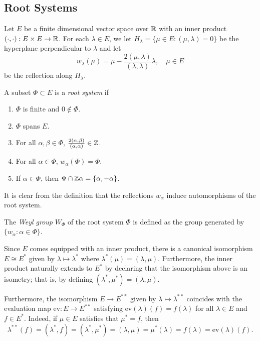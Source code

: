 \subsection{Root Systems}
Let $E$ be a finite dimensional vector space over $\mathbb{R}$ with an inner product $(\cdot,\cdot):E\times E\to\mathbb{R}$. For each $\lambda\in E$, we let $H_\lambda=\{\mu\in E:(\mu,\lambda)=0\}$ be the hyperplane perpendicular to $\lambda$ and let $$w_\lambda(\mu)=\mu-\frac{2(\mu,\lambda)}{(\lambda,\lambda)}\lambda,\quad \mu\in E$$ be the reflection along $H_\lambda$. 
\begin{definition}\label{def:rootsystem}
    A subset $\Phi\subset E$ is a \textit{root system} if
    \begin{enumerate}
        \item $\Phi$ is finite and $0\not\in\Phi$.
        \item $\Phi$ spans $E$.
        \item For all $\alpha,\beta\in\Phi$, $\frac{2(\alpha,\beta)}{(\alpha,\alpha)}\in\mathbb{Z}$.
        \item For all $\alpha\in\Phi$, $w_\alpha(\Phi)=\Phi$.
        \item If $\alpha\in\Phi$, then $\Phi\cap\mathbb{Z}\alpha=\{\alpha,-\alpha\}$.
    \end{enumerate}
\end{definition} 

It is clear from the definition that the reflections $w_\alpha$ induce automorphisms of the root system. 

\begin{definition}
    The \textit{Weyl group} $W_\Phi$ of the root system $\Phi$ is defined as the group generated by $\{w_\alpha:\alpha\in\Phi\}$.
\end{definition}

Since $E$ comes equipped with an inner product, there is a canonical isomorphism $E\cong E^*$ given by $\lambda\mapsto\lambda^*$ where $\lambda^*(\mu)=(\lambda,\mu)$. Furthermore, the inner product naturally extends to $E^*$ by declaring that the isomorphism above is an isometry; that is, by defining $(\lambda^*,\mu^*)=(\lambda,\mu)$. 

Furthermore, the isomorphism $E\rightarrow E^{**}$ given by $\lambda\mapsto\lambda^{**}$ coincides with the evaluation map $\mathrm{ev}:E\rightarrow E^{**}$ satisfying $\mathrm{ev}(\lambda)(f)=f(\lambda)$ for all $\lambda\in E$ and $f\in E^*$. Indeed, if $\mu\in E$ satisfies that $\mu^*=f$, then 
$$\lambda^{**}(f)=(\lambda^*,f)=(\lambda^*,\mu^*)=(\lambda,\mu)=\mu^*(\lambda)=f(\lambda)=\mathrm{ev}(\lambda)(f).$$

